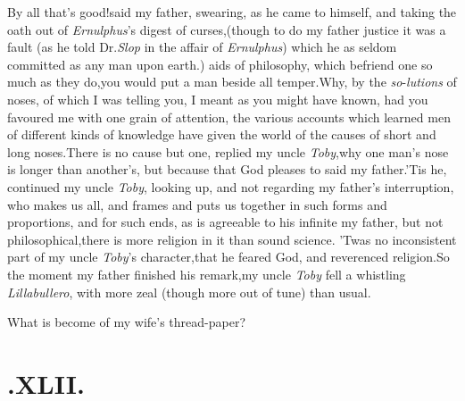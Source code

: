 \documentclass{article}
\begin{document}
By all that’s good!\@ said my father, swearing, as he came
to himself, and taking the oath out of \textit{Ernulphus}’s
digest of curses,\tsk (though to do my father
justice it was a fault (as he told Dr.\@ \textit{Slop} in the affair of
\textit{Ernulphus}) which he as seldom committed as any man upon
earth.)\tsh\break
{} \enlargethispage\baselineskip
{}
aids of philosophy, which befriend one\break
so much as they do,\tsk you would put a\break
man beside all temper.\tsk Why, by the
\textit{so}-\break\textit{lutions} of noses, of which I was telling you, I meant as
you might have known, had you favoured me with one grain of
attention, the various accounts which\break
learned men of different
kinds of know\-ledge have given the world of the causes of short and
long noses.\tsk There is no cause but one, replied my
uncle \textit{Toby},\tsk why one man’s nose is longer
than ano\-ther’s, but because that God pleases to
 said
my father.\tsk ’Tis he, continued my uncle \textit{Toby},
looking up, and not regarding my father’s interruption, who
makes us all, and frames and puts us together in such forms and
proportions, and for such ends, as is agreeable to his
infinite\break
{} my father,
but not philosophical,\tsk there is more religion in it than sound
science. ’Twas no inconsistent part of my uncle
\textit{Toby}’s character,\tsk that he feared God, and
reverenced religion.\tsh So the moment my father finished
his remark,\tsh my uncle \textit{Toby} fell a whistling
\textit{Lillabullero}, with more zeal (though more out of tune) than
usual.\tsh

What is become of my wife’s thread-paper?

\section{.\quad  XLII.}
\end{document}
